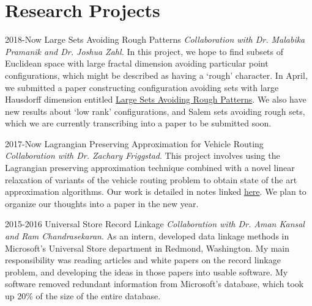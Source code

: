 \documentclass[a4paper]{cv-friggeri}
\begin{document}

\section{Research Projects}

\begin{entrylist}



\entry
{2018-Now}
{Large Sets Avoiding Rough Patterns}
{}
{\emph{Collaboration with Dr. Malabika Pramanik and Dr. Joshua Zahl.} In this project, we hope to find subsets of Euclidean space with large fractal dimension avoiding particular point configurations, which might be described as having a `rough' character. In April, we submitted a paper constructing configuration avoiding sets with large Hausdorff dimension entitled \href{https://github.com/jdjake/Notes/raw/master/Research/HausdorffDimension/FinalFractalsAvoidingFractalSetsPaper.pdf}{Large Sets Avoiding Rough Patterns}. We also have new results about `low rank' configurations, and Salem sets avoiding rough sets, which we are currently transcribing into a paper to be submitted soon.}


\entry
{2017-Now}
{Lagrangian Preserving Approximation for Vehicle Routing}
{}
{\emph{Collaboration with Dr. Zachary Friggstad}. This project involves using the Lagrangian preserving approximation technique combined with a novel linear relaxation of variants of the vehicle routing problem to obtain state of the art approximation algorithms. Our work is detailed in notes linked \href{https://github.com/jdjake/Notes/raw/master/Research/VehicleRouting/VehicleRouting.pdf}{here}. We plan to organize our thoughts into a paper in the new year.}


\entry
{2015-2016}
{Universal Store Record Linkage}
{}
{\emph{Collaboration with Dr. Aman Kansal and Ram Chandrasekaran}. As an intern, developed data linkage methods in Microsoft's Universal Store department in Redmond, Washington. My main responsibility was reading articles and white papers on the record linkage problem, and developing the ideas in those papers into usable software. My software removed redundant information from Microsoft's database, which took up 20\% of the size of the entire database.}


\end{entrylist}
\end{document}
